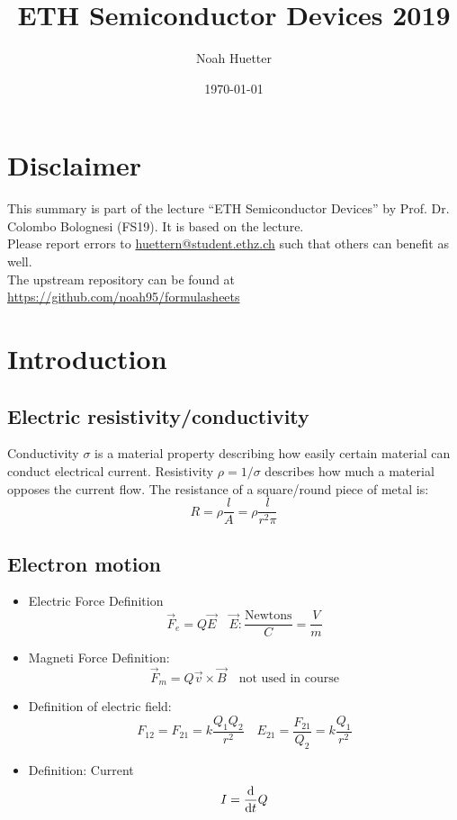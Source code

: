 \documentclass[a4paper, fontsize=8pt, landscape, DIV=1]{scrartcl}
\title{ETH Semiconductor Devices 2019}
\author{Noah Huetter}
\date{\today}
\begin{document}
\setcounter{secnumdepth}{2} %
\begin{multicols*}{4}
	\section*{Disclaimer}
	This summary is part of the lecture ``ETH Semiconductor Devices'' by Prof. Dr. Colombo Bolognesi (FS19). It is based on the lecture. \\[6pt]
	Please report errors to \href{mailto:huettern@student.ethz.ch}{huettern@student.ethz.ch} such that others can benefit as well.\\[6pt]	
  The upstream repository can be found at \href{https://github.com/noah95/formulasheets}{https://github.com/noah95/formulasheets}
	\vfill\null
	\pagebreak
  \maketitle 
  \thispagestyle{fancy}

  \section{Introduction}
    \subsection{Electric resistivity/conductivity}
    Conductivity $\sigma$ is a material property describing how easily certain material can conduct electrical current. Resistivity $\rho = 1/\sigma$ describes how much a material opposes the current flow. The resistance of a square/round piece of metal is:
    \[R=\rho\frac{l}{A}=\rho\frac{l}{r^2\pi}\]

    \subsection{Electron motion}
    \begin{itemize}
      \item Electric Force Definition
        \[\vec{F}_e = Q\vec{E} \quad \vec{E}:\frac{\text{Newtons}}{C}=\frac{V}{m}\]
      \item Magneti Force Definition:
        \[\vec{F}_m = Q\vec{v}\times\vec{B} \quad \text{not used in course}\]
      \item Definition of electric field:
        \[F_{12}=F_{21}=k\frac{Q_1Q_2}{r^2} \quad E_{21}=\frac{F_21}{Q_2}=k\frac{Q_1}{r^2}\]
      \item Definition: Current
        \[I = \frac{\mathrm{d}}{\mathrm{d}t}Q\]
    \end{itemize}


\end{multicols*}
\end{document}
